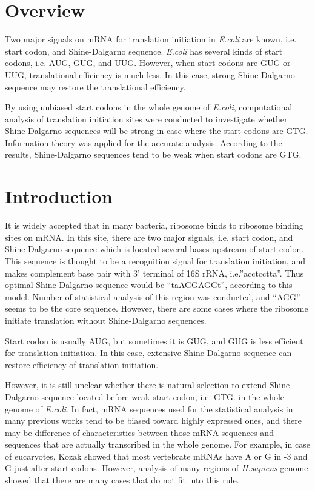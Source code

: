 
\section{Overview}

Two major signals on mRNA for translation initiation in {\it E.coli}
are known, i.e. start codon, and Shine-Dalgarno sequence.  {\it
E.coli} has several kinds of start codons, i.e. AUG, GUG, and UUG.
However, when start codons are GUG or UUG, translational efficiency is
much less. In this case, strong Shine-Dalgarno sequence may restore
the translational efficiency.

By using unbiased start codons in the whole genome of {\it E.coli},
computational analysis of translation initiation sites were conducted
to investigate whether Shine-Dalgarno sequences will be strong in case
where the start codons are GTG. Information theory was applied for the
accurate analysis. According to the results, Shine-Dalgarno sequences
tend to be weak when start codons are GTG.

\section{Introduction}

It is widely accepted that in many bacteria, ribosome binds to
ribosome binding sites on mRNA.  In this site, there are two major
signals, i.e. start codon, and Shine-Dalgarno sequence\cite{label7}
which is located several bases upstream of start codon. This sequence
is thought to be a recognition signal for translation initiation, and
makes complement base pair with 3' terminal of 16S rRNA,
i.e.''acctcctta''. Thus optimal Shine-Dalgarno sequence would be
``taAGGAGGt'', according to this model. Number of statistical analysis
of this region was conducted\cite{label11,arclabel5}, and ``AGG''
seems to be the core sequence. However, there are some cases where the
ribosome initiate translation without Shine-Dalgarno
sequences\cite{lts11}.

Start codon is usually AUG, but sometimes it is GUG\cite{label20}, and
GUG is less efficient for translation initiation. In this case,
extensive Shine-Dalgarno sequence can restore efficiency of
translation initiation\cite{arclabel12}.

However, it is still unclear whether there is natural selection to
extend Shine-Dalgarno sequence located before weak start codon,
i.e. GTG. in the whole genome of {\it E.coli}. In fact, mRNA sequences
used for the statistical analysis in many previous works tend to be
biased toward highly expressed ones, and there may be difference of
characteristics between those mRNA sequences and sequences that are
actually transcribed in the whole genome\cite{lts14}. For example, in
case of eucaryotes, Kozak\cite{label3} showed that most vertebrate
mRNAs have A or G in -3 and G just after start codons. However,
analysis of many regions of {\it H.sapiens} genome showed that there
are many cases that do not fit into this rule\cite{lnis1}.

